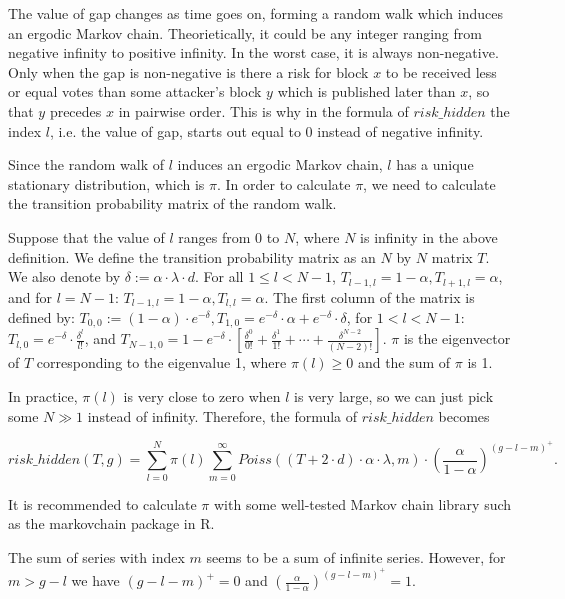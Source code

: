 \documentclass[a4paper,11pt]{article}
\begin{document}
The value of gap changes as time goes on, forming a random walk which induces an
ergodic Markov chain. Theorietically, it could be any integer ranging from
negative infinity to positive infinity. In the worst case, it is always
non-negative. Only when the gap is non-negative is there a risk for block $x$ to
be received less or equal votes than some attacker’s block $y$ which is
published later than $x$, so that $y$ precedes $x$ in pairwise order. This is
why in the formula of $risk\_hidden$ the index $l$, i.e. the value of gap,
starts out equal to 0 instead of negative infinity.

Since the random walk of $l$ induces an ergodic Markov chain, $l$ has a unique
stationary distribution, which is $\pi$. In order to calculate $\pi$, we need to
calculate the transition probability matrix of the random walk.

Suppose that the value of $l$ ranges from 0 to $N$, where $N$ is infinity in the
above definition. We define the transition probability matrix as an $N$ by $N$
matrix $T$. We also denote by $\delta := \alpha \cdot \lambda \cdot d$. For all
$1 \leq l < N - 1$, $T_{l-1,l} = 1 - \alpha, T_{l+1,l} = \alpha$, and for $l = N
- 1$: $T_{l-1,l} = 1 - \alpha, T_{l,l} = \alpha$. The first column of the matrix
is defined by: $T_{0,0} := (1 - \alpha) \cdot e^{-\delta}, T_{1,0} = e^{-\delta}
\cdot \alpha + e^{-\delta} \cdot \delta$, for $1 < l < N - 1$: $T_{l,0} =
e^{-\delta} \cdot \frac{\delta^l}{l!}$, and $T_{N-1,0} = 1 - e^{-\delta} \cdot
\left[\frac{\delta^0}{0!} + \frac{\delta^1}{1!} + \cdots +
\frac{\delta^{N-2}}{(N-2)!}\right]$.  $\pi$ is the eigenvector of $T$
corresponding to the eigenvalue 1, where $\pi(l) \geq 0$ and the sum of $\pi$ is
1.

In practice, $\pi(l)$ is very close to zero when $l$ is very large, so we can
just pick some $N \gg 1$ instead of infinity. Therefore, the formula of
$risk\_hidden$ becomes

$$
risk\_hidden(T,g) = \sum_{l=0}^{N} \pi(l) \sum_{m=0}^{\infty} Poiss((T + 2 \cdot
d) \cdot \alpha \cdot \lambda, m) \cdot \left(\frac{\alpha}{1-\alpha}\right)^{(g
- l - m)^+}.
$$

It is recommended to calculate $\pi$ with some well-tested Markov chain library such
as the markovchain package in R.

The sum of series with index $m$ seems to be a sum of infinite series. However,
for $m > g - l$ we have $(g - l - m)^+ = 0$ and
$\left(\frac{\alpha}{1-\alpha}\right)^{(g - l - m)^+} = 1$.
\end{document}
